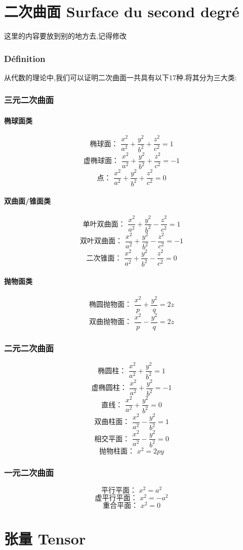 \documentclass[12pt, a4paper, oneside]{ctexbook}
\begin{document}
\chapter{二次曲面 Surface du second degré}
  这里的内容要放到别的地方去,记得修改
  \subsection{Définition}
  从代数的理论中,我们可以证明二次曲面一共具有以下17种.将其分为三大类:
  \subsection{三元二次曲面}
    \subsubsection{椭球面类}
    $$
    \text{椭球面： }\frac{x^2}{a^2}+\frac{y^2}{b^2}+\frac{z^2}{c^2}=1
    $$
    $$
    \text{虚椭球面： }\frac{x^2}{a^2}+\frac{y^2}{b^2}+\frac{z^2}{c^2}=-1
    $$
    $$
    \text{点： }\frac{x^2}{a^2}+\frac{y^2}{b^2}+\frac{z^2}{c^2}=0
    $$
    \subsubsection{双曲面/锥面类}
    $$
    \text{单叶双曲面： }\frac{x^2}{a^2}+\frac{y^2}{b^2}-\frac{z^2}{c^2}=1
    $$
    $$
    \text{双叶双曲面： }\frac{x^2}{a^2}+\frac{y^2}{b^2}-\frac{z^2}{c^2}=-1
    $$
    $$
    \text{二次锥面： }\frac{x^2}{a^2}+\frac{y^2}{b^2}-\frac{z^2}{c^2}=0
    $$
    \subsubsection{抛物面类}
    $$
    \text{椭圆抛物面： }\frac{x^2}{p}+\frac{y^2}{q}=2z
    $$
    $$
    \text{双曲抛物面： }\frac{x^2}{p}-\frac{y^2}{q}=2z
    $$
  \subsection{二元二次曲面}
    $$
    \text{椭圆柱： }\frac{x^2}{a^2}+\frac{y^2}{b^2}=1
    $$
    $$
    \text{虚椭圆柱： }\frac{x^2}{a^2}+\frac{y^2}{b^2}=-1
    $$
    $$
    \text{直线： }\frac{x^2}{a^2}+\frac{y^2}{b^2}=0
    $$
    $$
    \text{双曲柱面： }\frac{x^2}{a^2}-\frac{y^2}{b^2}=1
    $$
    $$
    \text{相交平面： }\frac{x^2}{a^2}-\frac{y^2}{b^2}=0
    $$
    $$
    \text{抛物柱面： }x^2=2py
    $$
  \subsection{一元二次曲面}
    $$
    \text{平行平面： }x^2=a^2
    $$
    $$
    \text{虚平行平面： }x^2=-a^2
    $$
    $$
    \text{重合平面： }x^2=0
    $$
  \chapter{张量 Tensor}







\ifx\allfiles\undefined
\end{document}
